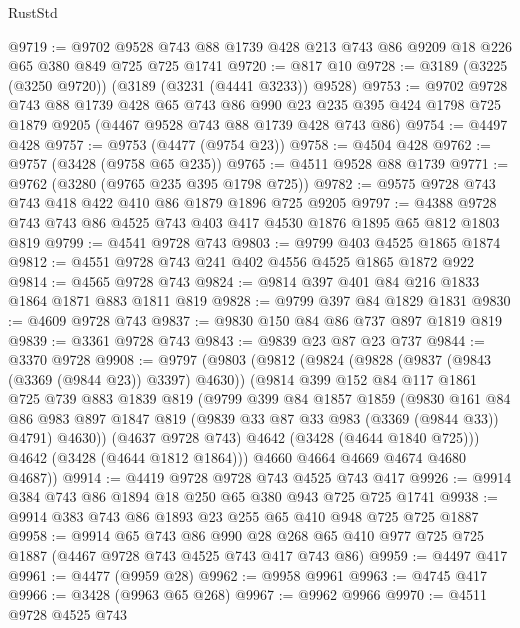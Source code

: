 \begin{lexlean}{RustStd}
\begin{coremodule}
@9719 := @9702 @9528 @743 @88 @1739 @428 @213 @743 @86 @9209 @18 @226 @65 @380 @849 @725 @725 @1741
@9720 := @817 @10
@9728 := @3189 (@3225 (@3250 @9720)) (@3189 (@3231 (@4441 @3233)) @9528)
@9753 := @9702
    @9728
    @743
    @88
    @1739
    @428
    @65
    @743
    @86
    @990
    @23
    @235
    @395
    @424
    @1798
    @725
    @1879
    @9205
    (@4467 @9528 @743 @88 @1739 @428 @743 @86)
@9754 := @4497 @428
@9757 := @9753 (@4477 (@9754 @23))
@9758 := @4504 @428
@9762 := @9757 (@3428 (@9758 @65 @235))
@9765 := @4511 @9528 @88 @1739
@9771 := @9762 (@3280 (@9765 @235 @395 @1798 @725))
@9782 := @9575 @9728 @743 @743 @418 @422 @410 @86 @1879 @1896 @725 @9205
@9797 := @4388 @9728 @743 @743 @86 @4525 @743 @403 @417 @4530 @1876 @1895 @65 @812 @1803 @819
@9799 := @4541 @9728 @743
@9803 := @9799 @403 @4525 @1865 @1874
@9812 := @4551 @9728 @743 @241 @402 @4556 @4525 @1865 @1872 @922
@9814 := @4565 @9728 @743
@9824 := @9814 @397 @401 @84 @216 @1833 @1864 @1871 @883 @1811 @819
@9828 := @9799 @397 @84 @1829 @1831
@9830 := @4609 @9728 @743
@9837 := @9830 @150 @84 @86 @737 @897 @1819 @819
@9839 := @3361 @9728 @743
@9843 := @9839 @23 @87 @23 @737
@9844 := @3370 @9728
@9908 := @9797
    (@9803
      (@9812
        (@9824
          (@9828 (@9837 (@9843 (@3369 (@9844 @23)) @3397) @4630))
          (@9814
            @399
            @152
            @84
            @117
            @1861
            @725
            @739
            @883
            @1839
            @819
            (@9799
              @399
              @84
              @1857
              @1859
              (@9830
                @161
                @84
                @86
                @983
                @897
                @1847
                @819
                (@9839 @33 @87 @33 @983 (@3369 (@9844 @33)) @4791)
                @4630))
            (@4637 @9728 @743)
            @4642
            (@3428 (@4644 @1840 @725)))
          @4642
          (@3428 (@4644 @1812 @1864)))
        @4660
        @4664
        @4669
        @4674
        @4680
        @4687))
@9914 := @4419 @9728 @9728 @743 @4525 @743 @417
@9926 := @9914 @384 @743 @86 @1894 @18 @250 @65 @380 @943 @725 @725 @1741
@9938 := @9914 @383 @743 @86 @1893 @23 @255 @65 @410 @948 @725 @725 @1887
@9958 := @9914
    @65
    @743
    @86
    @990
    @28
    @268
    @65
    @410
    @977
    @725
    @725
    @1887
    (@4467 @9728 @743 @4525 @743 @417 @743 @86)
@9959 := @4497 @417
@9961 := @4477 (@9959 @28)
@9962 := @9958 @9961
@9963 := @4745 @417
@9966 := @3428 (@9963 @65 @268)
@9967 := @9962 @9966
@9970 := @4511 @9728 @4525 @743

\end{coremodule}
\end{lexlean}

